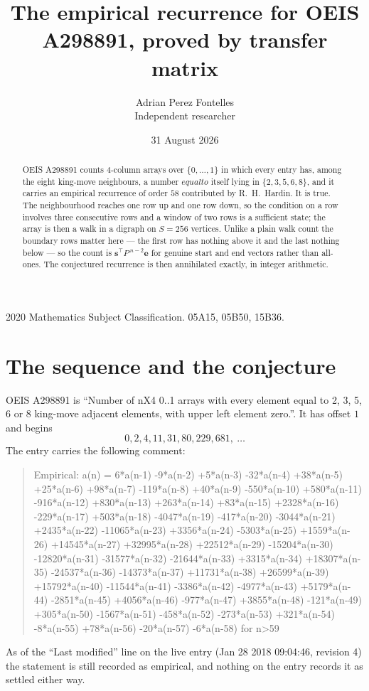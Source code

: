 \documentclass[11pt,a4paper]{article}
\title{The empirical recurrence for OEIS A298891, proved by transfer matrix}
\author{Adrian Perez Fontelles\\ \small Independent researcher}
\date{31 August 2026}
\theoremstyle{plain}
\theoremstyle{definition}
\begin{document}
\maketitle

\begin{abstract}
OEIS A298891 counts $4$-column arrays over $\{0,\dots,1\}$ in which every entry has,
among the eight king-move neighbours, a number $equal to$ itself lying in $\{2,3,5,6,8\}$, and it carries an empirical
recurrence of order $58$ contributed by R.~H.~Hardin. It is true. The neighbourhood
reaches one row up and one row down, so the condition on a row involves three consecutive
rows and a window of two rows is a sufficient state; the array is then a walk in a digraph
on $S=256$ vertices. Unlike a plain walk count the boundary rows matter here --- the first
row has nothing above it and the last nothing below --- so the count is
$\mathbf{s}^{\!\top}P^{\,n-2}\mathbf{e}$ for genuine start and end vectors rather than
all-ones. The conjectured recurrence is then annihilated exactly, in integer arithmetic.
\end{abstract}

\noindent\small 2020 Mathematics Subject Classification. 05A15, 05B50, 15B36.\normalsize

\section{The sequence and the conjecture}

OEIS A298891 is ``Number of nX4 0..1 arrays with every element equal to 2, 3, 5, 6 or 8 king-move adjacent elements, with upper left element zero.''. It has offset
$1$ and begins
\[
0, 2, 4, 11, 31, 80, 229, 681,\ \dots
\]
The entry carries the following comment:
\begin{quote}\small
Empirical: a(n) = 6*a(n-1) -9*a(n-2) +5*a(n-3) -32*a(n-4) +38*a(n-5) +25*a(n-6) +98*a(n-7) -119*a(n-8) +40*a(n-9) -550*a(n-10) +580*a(n-11) -916*a(n-12) +830*a(n-13) +263*a(n-14) +83*a(n-15) +2328*a(n-16) -229*a(n-17) +503*a(n-18) -4047*a(n-19) -417*a(n-20) -3044*a(n-21) +2435*a(n-22) -11065*a(n-23) +3356*a(n-24) -5303*a(n-25) +1559*a(n-26) +14545*a(n-27) +32995*a(n-28) +22512*a(n-29) -15204*a(n-30) -12820*a(n-31) -31577*a(n-32) -21644*a(n-33) +3315*a(n-34) +18307*a(n-35) -24537*a(n-36) -14373*a(n-37) +11731*a(n-38) +26599*a(n-39) +15792*a(n-40) -11544*a(n-41) -3386*a(n-42) -4977*a(n-43) +5179*a(n-44) -2851*a(n-45) +4056*a(n-46) -977*a(n-47) +3855*a(n-48) -121*a(n-49) +305*a(n-50) -1567*a(n-51) -458*a(n-52) -273*a(n-53) +321*a(n-54) -8*a(n-55) +78*a(n-56) -20*a(n-57) -6*a(n-58) for n>59
\end{quote}
As of the ``Last modified'' line on the live entry (Jan 28 2018 09:04:46, revision
4) the statement is still recorded as empirical, and nothing on the entry
records it as settled either way.
\end{document}
